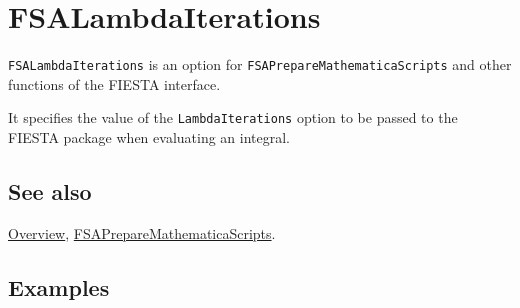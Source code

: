 \documentclass[../FeynHelpersManual.tex]{subfiles}
\begin{document}
\begin{Shaded}
\begin{Highlighting}[]
 
\end{Highlighting}
\end{Shaded}

\hypertarget{fsalambdaiterations}{
\section{FSALambdaIterations}\label{fsalambdaiterations}}

\texttt{FSALambdaIterations} is an option for
\texttt{FSAPrepareMathematicaScripts} and other functions of the FIESTA
interface.

It specifies the value of the \texttt{LambdaIterations} option to be
passed to the FIESTA package when evaluating an integral.

\subsection{See also}

\hyperlink{toc}{Overview},
\hyperlink{fsapreparemathematicascripts}{FSAPrepareMathematicaScripts}.

\subsection{Examples}
\end{document}
